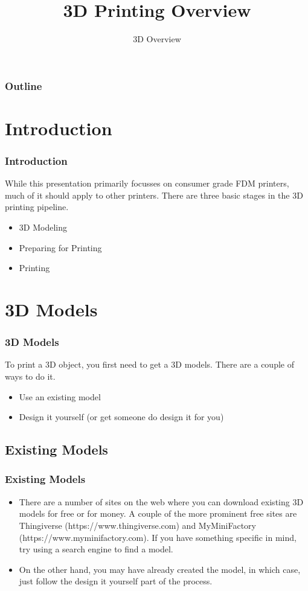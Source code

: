 \documentclass[english,10pt]{beamer}
\title{3D Printing Overview}
\subtitle{3D Overview}
\begin{document}
\begin{frame}
  \titlepage
\end{frame}

\begin{frame}
  \frametitle{Outline}
  \tableofcontents
\end{frame}

\section{Introduction}
\begin{frame}
  \frametitle{Introduction}
  While this presentation primarily focusses on consumer grade FDM printers, much of it should apply to other printers.  There are three basic stages in the 3D printing pipeline.
  \begin{itemize}
    \item 3D Modeling
    \item Preparing for Printing
    \item Printing
  \end{itemize}
\end{frame}

\section{3D Models}
\begin{frame}
  \frametitle{3D Models}
  To print a 3D object, you first need to get a 3D models.  There are a couple of ways to do it.
  \begin{itemize}
    \item Use an existing model
    \item Design it yourself (or get someone do design it for you)
  \end{itemize}
\end{frame}

\subsection{Existing Models}
\begin{frame}
  \frametitle{Existing Models}
  \begin{itemize}
    \item There are a number of sites on the web where you can download existing 3D models for free or for money.  A couple of the more prominent free sites are Thingiverse (https://www.thingiverse.com) and MyMiniFactory (https://www.myminifactory.com).  If you have something specific in mind, try using a search engine to find a model.

    \item  On the other hand, you may have already created the model, in which case, just follow the design it yourself part of the process.
  \end{itemize}
\end{frame}
\end{document}
